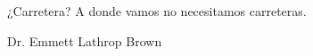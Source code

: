 \thispagestyle{empty}

\vspace*{\fill}
	\epigraph{¿Carretera? A donde vamos no necesitamos carreteras.}{Dr. Emmett Lathrop Brown}
\vspace*{\fill}
